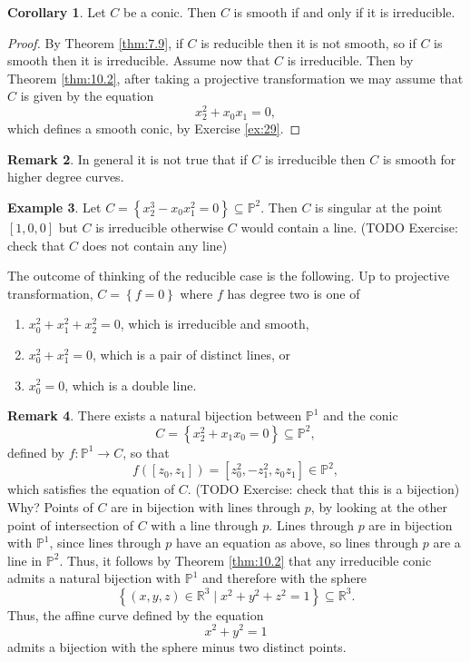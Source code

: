 \documentclass{article}
\newcommand{\R}{\mathbb{R}}
\renewcommand{\P}{\mathbb{P}}
\newcommand{\rb}[1]{\left( #1 \right)}
\renewcommand{\sb}[1]{\left[ #1 \right]}
\newcommand{\cb}[1]{\left\{ #1 \right\}}
\theoremstyle{definition}\newtheorem{definition}{Definition}[section]
\theoremstyle{definition}\newtheorem{notation}[definition]{Notation}
\theoremstyle{definition}\newtheorem{remark}[definition]{Remark}
\theoremstyle{definition}\newtheorem{example}[definition]{Example}
\theoremstyle{definition}\newtheorem{fact}{Fact}
\theoremstyle{definition}\newtheorem{exercise}{Exercise}
\newtheorem{corollary}[definition]{Corollary}
\begin{document}
\begin{corollary}
Let $ C $ be a conic. Then $ C $ is smooth if and only if it is irreducible.
\end{corollary}

\begin{proof}
By Theorem \ref{thm:7.9}, if $ C $ is reducible then it is not smooth, so if $ C $ is smooth then it is irreducible. Assume now that $ C $ is irreducible. Then by Theorem \ref{thm:10.2}, after taking a projective transformation we may assume that $ C $ is given by the equation
$$ x_2^2 + x_0x_1 = 0, $$
which defines a smooth conic, by Exercise \ref{ex:29}.
\end{proof}

\begin{remark}
In general it is not true that if $ C $ is irreducible then $ C $ is smooth for higher degree curves.
\end{remark}

\begin{example}
Let $ C = \cb{x_2^3 - x_0x_1^2 = 0} \subseteq \P^2 $. Then $ C $ is singular at the point $ \sb{1, 0, 0} $ but $ C $ is irreducible otherwise $ C $ would contain a line. (TODO Exercise: check that $ C $ does not contain any line)
\end{example}

The outcome of thinking of the reducible case is the following. Up to projective transformation, $ C = \cb{f = 0} $ where $ f $ has degree two is one of
\begin{enumerate}
\item $ x_0^2 + x_1^2 + x_2^2 = 0 $, which is irreducible and smooth,
\item $ x_0^2 + x_1^2 = 0 $, which is a pair of distinct lines, or
\item $ x_0^2 = 0 $, which is a double line.
\end{enumerate}

\begin{remark}
There exists a natural bijection between $ \P^1 $ and the conic
$$ C = \cb{x_2^2 + x_1x_0 = 0} \subseteq \P^2, $$
defined by $ f : \P^1 \to C $, so that
$$ f\rb{\sb{z_0, z_1}} = \sb{z_0^2, -z_1^2, z_0z_1} \in \P^2, $$
which satisfies the equation of $ C $. (TODO Exercise: check that this is a bijection) Why? Points of $ C $ are in bijection with lines through $ p $, by looking at the other point of intersection of $ C $ with a line through $ p $. Lines through $ p $ are in bijection with $ \P^1 $, since lines through $ p $ have an equation as above, so lines through $ p $ are a line in $ \P^2 $. Thus, it follows by Theorem \ref{thm:10.2} that any irreducible conic admits a natural bijection with $ \P^1 $ and therefore with the sphere
$$ \cb{\rb{x, y, z} \in \R^3 \mid x^2 + y^2 + z^2 = 1} \subseteq \R^3. $$
Thus, the affine curve defined by the equation
$$ x^2 + y^2 = 1 $$
admits a bijection with the sphere minus two distinct points.
\end{remark}
\end{document}
